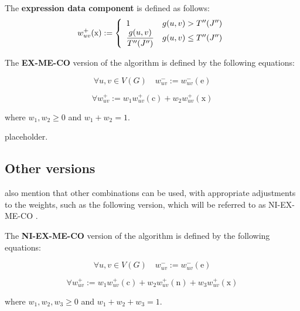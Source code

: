 \begin{definition}
    The \textbf{expression data component} is defined as follows: $$w_{uv}^+(\mathrm x) := \soe{ll}{1 & g(u, v) > T''(J'') \\ \dfrac{g(u, v)}{T''(J'')} & g(u, v) \le T''(J'')}$$
\end{definition}

\begin{definition}[EX-ME-CO]
    The \textbf{EX-ME-CO} version of the algorithm is defined by the following equations:

    \begin{equation}
        \forall u, v \in V(G) \quad w_{uv}^- := w_{uv}^-(\mathrm e)
    \end{equation}

    \begin{equation}
        \forall w_{uv}^+ := w_1 w_{uv}^+(\mathrm c) + w_2 w_{uv}^+(\mathrm x)
    \end{equation}

    where $w_1, w_2 \ge 0$ and $w_1 + w_2 = 1$.
\end{definition}

placeholder. 

\subsection{Other versions}

\textcite{c3} also mention that other combinations can be used, with appropriate adjustments to the weights, such as the following version, which will be referred to as NI-EX-ME-CO .

\begin{definition}[NI-EX-ME-CO]
    The \textbf{NI-EX-ME-CO} version of the algorithm is defined by the following equations:

    \begin{equation}
        \forall u, v \in V(G) \quad w_{uv}^- := w_{uv}^-(\mathrm e)
    \end{equation}

    \begin{equation}
        \forall w_{uv}^+ := w_1 w_{uv}^+(\mathrm c) + w_2 w_{uv}^+(\mathrm n) + w_3 w_{uv}^+(\mathrm x)
    \end{equation}

    where $w_1, w_2, w_3 \ge 0$ and $w_1 + w_2 + w_3 = 1$.
\end{definition}

